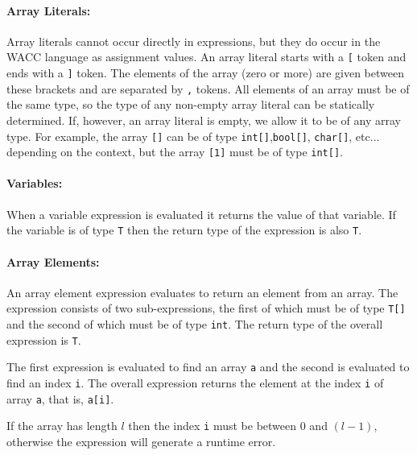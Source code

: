 \documentclass[a4paper]{article}
\theoremstyle{definition}
\begin{document}
\paragraph{Array Literals:} Array literals cannot occur directly in expressions, but they do occur in the WACC language as assignment values.
An array literal starts with a \texttt{[} token and ends with a \texttt{]} token.
The elements of the array (zero or more) are given between these brackets and are separated by \texttt{,} tokens.
All elements of an array must be of the same type, so the type of any non-empty array literal can be statically determined.
If, however, an array literal is empty, we allow it to be of any array type.
For example, the array \texttt{[]} can be of type \texttt{int[]},\texttt{bool[]}, \texttt{char[]}, etc... depending on the context, but the array \texttt{[1]} must be of type \texttt{int[]}.

\paragraph{Variables:}
When a variable expression  is evaluated it returns the value of that variable.
If the variable is of type \texttt{T} then the return type of the expression is also \texttt{T}.

\paragraph{Array Elements:}
An array element expression evaluates to return an element from an array.
The expression consists of two sub-expressions, the first of which must be of type \texttt{T[]} and the second of which must be of type \texttt{int}.
The return type of the overall expression is \texttt{T}.

The first expression is evaluated to find an array \texttt{a} and the second is evaluated to find an index \texttt{i}.
The overall expression returns the element at the index \texttt{i} of array \texttt{a}, that is, \texttt{a[i]}.

If the array has length $l$ then the index \texttt{i} must be between $0$ and $(l - 1)$,
otherwise the expression will generate a runtime error.
\end{document}
